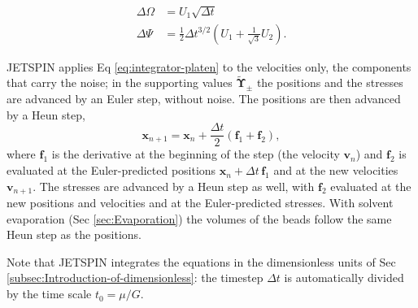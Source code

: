 \begin{equation}
\begin{alignedat}{1}\Delta\Omega & =U_{1}\sqrt{\Delta t}\\
\Delta\varPsi & =\frac{1}{2}\Delta t^{3/2}\left(U_{1}+\frac{1}{\sqrt{3}}U_{2}\right).
\end{alignedat}
\label{eq:random-var-1}
\end{equation}

JETSPIN applies Eq \ref{eq:integrator-platen} to the velocities only,
the components that carry the noise; in the supporting values
$\widetilde{\boldsymbol{\Upsilon}}_{\pm}$ the positions and the stresses
are advanced by an Euler step, without noise. The positions are then
advanced by a Heun step,
\begin{equation}
\textbf{x}_{n+1}=\textbf{x}_{n}+\frac{\Delta t}{2}\left(\textbf{f}_{1}+\textbf{f}_{2}\right),
\end{equation}
where $\textbf{f}_{1}$ is the derivative at the beginning of the step
(the velocity $\textbf{v}_{n}$) and $\textbf{f}_{2}$ is evaluated at
the Euler-predicted positions $\textbf{x}_{n}+\Delta t\,\textbf{f}_{1}$
and at the new velocities $\textbf{v}_{n+1}$. The stresses are advanced
by a Heun step as well, with $\textbf{f}_{2}$ evaluated at the new positions
and velocities and at the Euler-predicted stresses. With solvent evaporation
(Sec \ref{sec:Evaporation}) the volumes of the beads follow the same
Heun step as the positions.

Note that JETSPIN integrates the equations in the dimensionless units
of Sec \ref{subsec:Introduction-of-dimensionless}: the timestep $\Delta t$
is automatically divided by the time scale $t_{0}=\mu/G$.
